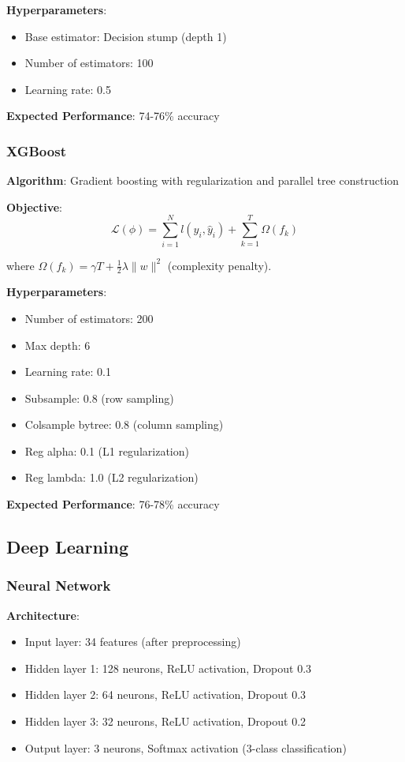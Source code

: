 \textbf{Hyperparameters}:
\begin{itemize}
\item Base estimator: Decision stump (depth 1)
\item Number of estimators: 100
\item Learning rate: 0.5
\end{itemize}

\textbf{Expected Performance}: 74-76\% accuracy

\subsubsection{XGBoost}

\textbf{Algorithm}: Gradient boosting with regularization and parallel tree construction

\textbf{Objective}:
$$\mathcal{L}(\phi) = \sum_{i=1}^{N} l(y_i, \hat{y}_i) + \sum_{k=1}^{T} \Omega(f_k)$$

where $\Omega(f_k) = \gamma T + \frac{1}{2} \lambda \|w\|^2$ (complexity penalty).

\textbf{Hyperparameters}:
\begin{itemize}
\item Number of estimators: 200
\item Max depth: 6
\item Learning rate: 0.1
\item Subsample: 0.8 (row sampling)
\item Colsample bytree: 0.8 (column sampling)
\item Reg alpha: 0.1 (L1 regularization)
\item Reg lambda: 1.0 (L2 regularization)
\end{itemize}

\textbf{Expected Performance}: 76-78\% accuracy

\subsection{Deep Learning}

\subsubsection{Neural Network}

\textbf{Architecture}:
\begin{itemize}
\item Input layer: 34 features (after preprocessing)
\item Hidden layer 1: 128 neurons, ReLU activation, Dropout 0.3
\item Hidden layer 2: 64 neurons, ReLU activation, Dropout 0.3
\item Hidden layer 3: 32 neurons, ReLU activation, Dropout 0.2
\item Output layer: 3 neurons, Softmax activation (3-class classification)
\end{itemize}

